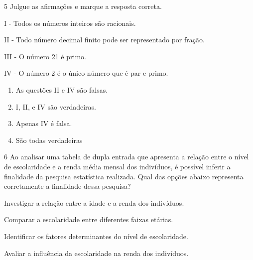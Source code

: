 




\num{5} Julgue as afirmações e marque a resposta correta.

I - Todos os números inteiros são racionais.

II - Todo número decimal finito pode ser representado por fração.

III - O número 21 é primo.

IV - O número 2 é o único número que é par e primo.

\begin{enumerate}
\def\labelenumi{\alph{enumi})}
\item
  As questões II e IV são falsas.
\item
  I, II, e IV são verdadeiras.
\item
  Apenas IV é falsa.
\item
  São todas verdadeiras
\end{enumerate}






\num{6} Ao analisar uma tabela de dupla entrada que apresenta a relação entre
o nível de escolaridade e a renda média mensal dos indivíduos, é
possível inferir a finalidade da pesquisa estatística realizada. Qual
das opções abaixo representa corretamente a finalidade dessa pesquisa?
\item Investigar a relação entre a idade e a renda dos indivíduos.
\item Comparar a escolaridade entre diferentes faixas etárias.
\item Identificar os fatores determinantes do nível de escolaridade.
\item Avaliar a influência da escolaridade na renda dos indivíduos.

